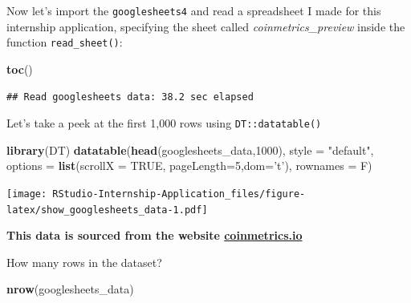 \documentclass[
]{book}
\newenvironment{Shaded}{\begin{snugshade}}{\end{snugshade}}
\newcommand{\CommentTok}[1]{\textcolor[rgb]{0.56,0.35,0.01}{\textit{#1}}}
\newcommand{\DataTypeTok}[1]{\textcolor[rgb]{0.13,0.29,0.53}{#1}}
\newcommand{\DecValTok}[1]{\textcolor[rgb]{0.00,0.00,0.81}{#1}}
\newcommand{\KeywordTok}[1]{\textcolor[rgb]{0.13,0.29,0.53}{\textbf{#1}}}
\newcommand{\NormalTok}[1]{#1}
\newcommand{\OperatorTok}[1]{\textcolor[rgb]{0.81,0.36,0.00}{\textbf{#1}}}
\newcommand{\OtherTok}[1]{\textcolor[rgb]{0.56,0.35,0.01}{#1}}
\newcommand{\StringTok}[1]{\textcolor[rgb]{0.31,0.60,0.02}{#1}}
\begin{document}
Now let's import the \texttt{googlesheets4} and read a spreadsheet I made for this internship application, specifying the sheet called \emph{coinmetrics\_preview} inside the function \texttt{read\_sheet()}:

\begin{Shaded}
\end{Shaded}

\begin{Shaded}
\begin{Highlighting}[]
\KeywordTok{toc}\NormalTok{()}
\end{Highlighting}
\end{Shaded}

\begin{verbatim}
## Read googlesheets data: 38.2 sec elapsed
\end{verbatim}

Let's take a peek at the first 1,000 rows using \texttt{DT::datatable()} \citep{R-DT}

\begin{Shaded}
\begin{Highlighting}[]
\KeywordTok{library}\NormalTok{(DT)}
\KeywordTok{datatable}\NormalTok{(}\KeywordTok{head}\NormalTok{(googlesheets_data,}\DecValTok{1000}\NormalTok{),  }\DataTypeTok{style =} \StringTok{"default"}\NormalTok{, }
          \DataTypeTok{options =} \KeywordTok{list}\NormalTok{(}\DataTypeTok{scrollX =} \OtherTok{TRUE}\NormalTok{, }\DataTypeTok{pageLength=}\DecValTok{5}\NormalTok{,}\DataTypeTok{dom=}\StringTok{'t'}\NormalTok{), }\DataTypeTok{rownames =}\NormalTok{ F)}
\end{Highlighting}
\end{Shaded}

\texttt{[image: RStudio-Internship-Application\_files/figure-latex/show\_googlesheets\_data-1.pdf]}

\textbf{This data is sourced from the website \href{https://coinmetrics.io/community-network-data/\#comm-files}{coinmetrics.io}}

How many rows in the dataset?

\begin{Shaded}
\begin{Highlighting}[]
\KeywordTok{nrow}\NormalTok{(googlesheets_data)}
\end{Highlighting}
\end{Shaded}
\end{document}
